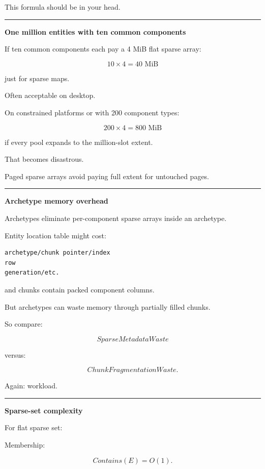 This formula should be in your head.

\begin{center}\rule{0.5\linewidth}{0.5pt}\end{center}

\textbf{One million entities with ten common components}

If ten common components each pay a 4 MiB flat sparse array:

\[
10\times4
=
40\text{ MiB}
\]

just for sparse maps.

Often acceptable on desktop.

On constrained platforms or with 200 component types:

\[
200\times4
=
800\text{ MiB}
\]

if every pool expands to the million-slot extent.

That becomes disastrous.

Paged sparse arrays avoid paying full extent for untouched pages.

\begin{center}\rule{0.5\linewidth}{0.5pt}\end{center}

\textbf{Archetype memory overhead}

Archetypes eliminate per-component sparse arrays inside an archetype.

Entity location table might cost:

\begin{verbatim}
archetype/chunk pointer/index
row
generation/etc.
\end{verbatim}

and chunks contain packed component columns.

But archetypes can waste memory through partially filled chunks.

So compare:

\[
SparseMetadataWaste
\]

versus:

\[
ChunkFragmentationWaste.
\]

Again: workload.

\begin{center}\rule{0.5\linewidth}{0.5pt}\end{center}

\textbf{Sparse-set complexity}

For flat sparse set:

Membership:

\[
Contains(E)=O(1).
\]

